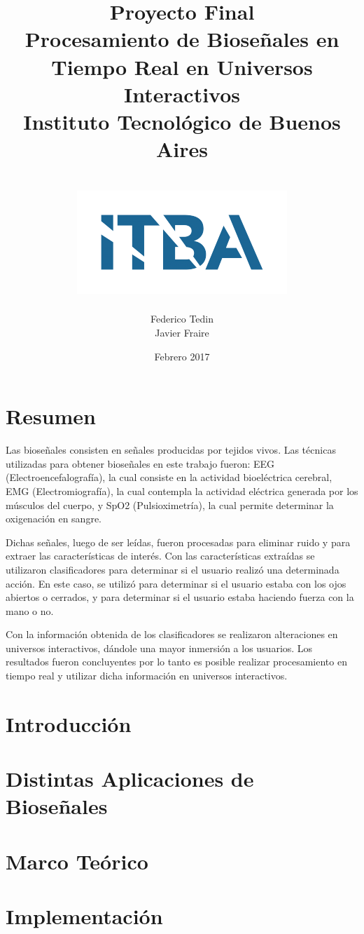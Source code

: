 \documentclass[a4paper]{report}
\title{
	{\LARGE Proyecto Final}\\
	{\Huge Procesamiento de Bioseñales en Tiempo Real en Universos Interactivos}\\
	{\large Instituto Tecnológico de Buenos Aires}\\~\\
	{\includegraphics{itba.png}}
}
\author{{Federico Tedin} \\ {Javier Fraire}}
\date{Febrero 2017}
\begin{document}
\maketitle

\chapter*{Resumen}
\justifying
Las bioseñales consisten en señales producidas por tejidos vivos. Las técnicas utilizadas para obtener bioseñales en este trabajo fueron: EEG (Electroencefalografía), la cual consiste en la actividad bioeléctrica cerebral, EMG (Electromiografía), la cual contempla la actividad eléctrica generada por los músculos del cuerpo, y SpO2 (Pulsioximetría), la cual permite determinar la oxigenación en sangre.

Dichas señales, luego de ser leídas, fueron procesadas para eliminar ruido y para extraer las características de interés. Con las características extraídas se utilizaron clasificadores para determinar si el usuario realizó una determinada acción. En este caso, se utilizó para determinar si el usuario estaba con los ojos abiertos o cerrados, y para determinar si el usuario estaba haciendo fuerza con la mano o no.

Con la información obtenida de los clasificadores se realizaron alteraciones en universos interactivos, dándole una mayor inmersión a los usuarios. Los resultados fueron concluyentes por lo tanto es posible realizar procesamiento en tiempo real y utilizar dicha información en universos interactivos.

\tableofcontents

\chapter{Introducción}


\chapter{Distintas Aplicaciones de Bioseñales} \label{chap:biosignal-apps}


\chapter{Marco Teórico}


\chapter{Implementación}

\end{document}

